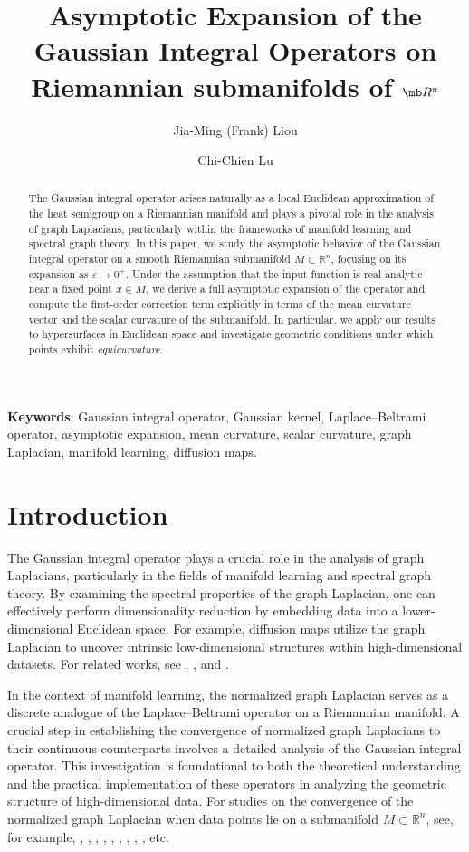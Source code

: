 \documentclass{amsart}
\title{Asymptotic Expansion of the Gaussian Integral Operators on Riemannian submanifolds of $\mb R^{n}$}
\author{Jia-Ming (Frank) Liou}
\author{Chi-Chien Lu}
\theoremstyle{Theorem}
\theoremstyle{remark}
\numberwithin{equation}{section} \numberwithin{figure}{section}
\renewcommand*{\to}{\rightarrow}
\begin{document}
\fontsize{12}{20pt}\selectfont
\maketitle

\begin{abstract}
The Gaussian integral operator arises naturally as a local Euclidean approximation of the heat semigroup on a Riemannian manifold and plays a pivotal role in the analysis of graph Laplacians, particularly within the frameworks of manifold learning and spectral graph theory. In this paper, we study the asymptotic behavior of the Gaussian integral operator on a smooth Riemannian submanifold \( M \subset \mathbb{R}^n \), focusing on its expansion as \( \varepsilon \to 0^+ \). Under the assumption that the input function is real analytic near a fixed point \( x \in M \), we derive a full asymptotic expansion of the operator and compute the first-order correction term explicitly in terms of the mean curvature vector and the scalar curvature of the submanifold. In particular, we apply our results to hypersurfaces in Euclidean space and investigate geometric conditions under which points exhibit \emph{equicurvature}.
\end{abstract}



\noindent\textbf{Keywords}: Gaussian integral operator, Gaussian kernel, Laplace–Beltrami operator, asymptotic expansion, mean curvature, scalar curvature, graph Laplacian, manifold learning, diffusion maps.

 
\section{Introduction}
The Gaussian integral operator plays a crucial role in the analysis of graph Laplacians, particularly in the fields of manifold learning and spectral graph theory. By examining the spectral properties of the graph Laplacian, one can effectively perform dimensionality reduction by embedding data into a lower-dimensional Euclidean space. For example, diffusion maps utilize the graph Laplacian to uncover intrinsic low-dimensional structures within high-dimensional datasets. For related works, see \cite{BN}, \cite{CS}, and \cite{CLL}.

In the context of manifold learning, the normalized graph Laplacian serves as a discrete analogue of the Laplace–Beltrami operator on a Riemannian manifold. A crucial step in establishing the convergence of normalized graph Laplacians to their continuous counterparts involves a detailed analysis of the Gaussian integral operator. This investigation is foundational to both the theoretical understanding and the practical implementation of these operators in analyzing the geometric structure of high-dimensional data. For studies on the convergence of the normalized graph Laplacian when data points lie on a submanifold \( M \subset \mathbb{R}^n \), see, for example, \cite{DB}, \cite{S1}, \cite{S2}, \cite{S3}, \cite{HAL}, \cite{BN1}, \cite{BN3}, \cite{SA}, \cite{CS}, etc.
\end{document}
